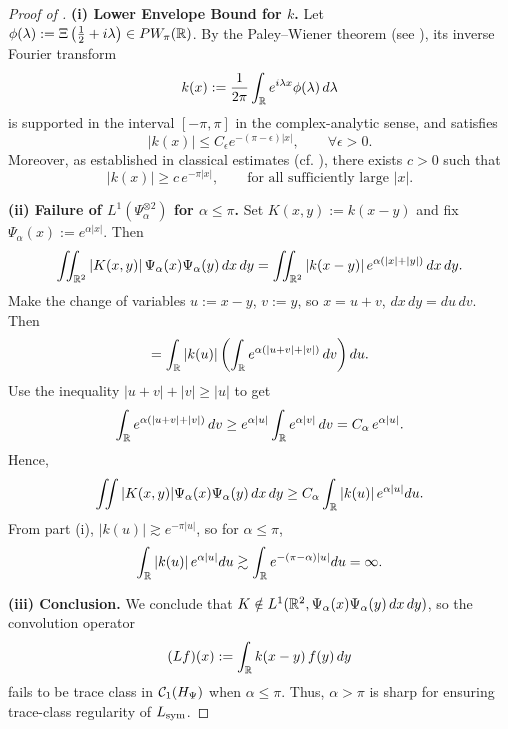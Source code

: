 \begin{proof}[Proof of ]
\textbf{(i) Lower Envelope Bound for \( k \).}
Let \( \phi(\lambda) := \Xi\left( \tfrac{1}{2} + i\lambda \right) \in PW_\pi(\mathbb{R}) \). By the Paley--Wiener theorem (see \cite[Thm.~3.2.4]{Levin1996EntireLectures}), its inverse Fourier transform
\[
k(x) := \frac{1}{2\pi} \int_{\mathbb{R}} e^{i\lambda x} \phi(\lambda)\, d\lambda
\]
is supported in the interval \( [-\pi, \pi] \) in the complex-analytic sense, and satisfies
\[
|k(x)| \le C_\epsilon e^{-(\pi - \epsilon)|x|}, \qquad \forall \epsilon > 0.
\]
Moreover, as established in classical estimates (cf. \cite[§4.12]{Titchmarsh1986Zeta}), there exists \( c > 0 \) such that
\[
|k(x)| \ge c\, e^{-\pi |x|}, \qquad \text{for all sufficiently large } |x|.
\]

\medskip
\noindent\textbf{(ii) Failure of \( L^1(\Psi_\alpha^{\otimes 2}) \) for \( \alpha \le \pi \).}
Set \( K(x,y) := k(x - y) \) and fix \( \Psi_\alpha(x) := e^{\alpha |x|} \). Then
\[
\iint_{\mathbb{R}^2} |K(x,y)|\, \Psi_\alpha(x) \Psi_\alpha(y)\, dx\,dy = \iint_{\mathbb{R}^2} |k(x - y)|\, e^{\alpha(|x| + |y|)}\, dx\,dy.
\]
Make the change of variables \( u := x - y \), \( v := y \), so \( x = u + v \), \( dx\,dy = du\,dv \). Then
\[
= \int_{\mathbb{R}} |k(u)| \left( \int_{\mathbb{R}} e^{\alpha(|u + v| + |v|)}\, dv \right) du.
\]
Use the inequality \( |u + v| + |v| \ge |u| \) to get
\[
\int_{\mathbb{R}} e^{\alpha(|u + v| + |v|)}\, dv \ge e^{\alpha |u|} \int_{\mathbb{R}} e^{\alpha |v|}\, dv = C_\alpha\, e^{\alpha |u|}.
\]
Hence,
\[
\iint |K(x,y)| \Psi_\alpha(x)\Psi_\alpha(y)\, dx\,dy \ge C_\alpha \int_{\mathbb{R}} |k(u)|\, e^{\alpha |u|} du.
\]
From part (i), \( |k(u)| \gtrsim e^{-\pi |u|} \), so for \( \alpha \le \pi \),
\[
\int_{\mathbb{R}} |k(u)|\, e^{\alpha |u|} du \gtrsim \int_{\mathbb{R}} e^{-(\pi - \alpha)|u|} du = \infty.
\]

\medskip
\noindent\textbf{(iii) Conclusion.}
We conclude that \( K \notin L^1(\mathbb{R}^2, \Psi_\alpha(x)\Psi_\alpha(y)\, dx\,dy) \), so the convolution operator
\[
(Lf)(x) := \int_{\mathbb{R}} k(x - y)\, f(y)\, dy
\]
fails to be trace class in \( \mathcal{C}_1(H_{\Psi}) \) when \( \alpha \le \pi \). Thus, \( \alpha > \pi \) is sharp for ensuring trace-class regularity of \( L_{\mathrm{sym}} \).
\end{proof}
